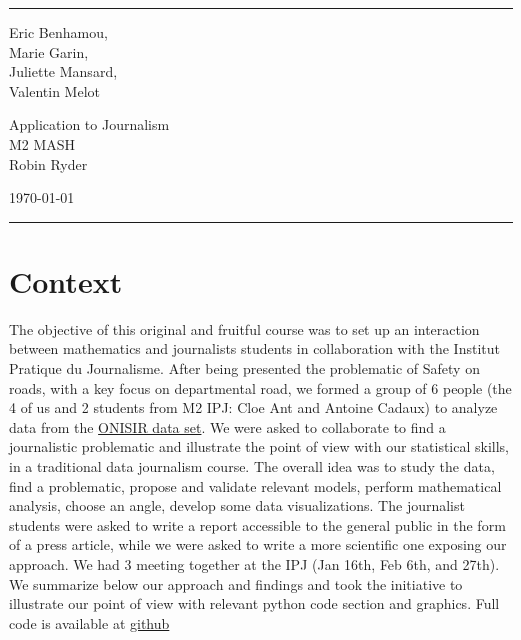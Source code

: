 \documentclass[a4paper]{article}
\theoremstyle{definition}
\theoremstyle{proposition}
\begin{document}

\fancyhead[C]{}
\hrule \medskip %
\begin{minipage}{0.295\textwidth} 
\raggedright
\footnotesize
Eric Benhamou, \hfill\\   
Marie Garin, \hfill\\   
Juliette Mansard, \hfill\\
Valentin Melot  \hfill\\
\end{minipage}
\begin{minipage}{0.4\textwidth} 
\centering 
\large 
Application to Journalism\\ 
\normalsize 
M2 MASH \\ 
Robin Ryder
\end{minipage}
\begin{minipage}{0.295\textwidth} 
\raggedleft
\today\hfill\\
\end{minipage}
\medskip\hrule 
\bigskip


\section{Context}
The objective of this original and fruitful course was to set up an interaction between mathematics and journalists students in collaboration with the Institut Pratique du Journalisme. After being presented the problematic of Safety on roads, with a key focus on departmental road, we formed a group of 6 people (the 4 of us and 2 students from M2 IPJ: Cloe Ant and Antoine Cadaux) to analyze data from the \href{https://www.data.gouv.fr/fr/datasets/base-de-donnees-accidents-corporels-de-la-circulation/}{ONISIR data set}. We were asked to collaborate to find a journalistic problematic and illustrate the point of view with our statistical skills, in a traditional data journalism course. The overall idea was to study the data, find a problematic, propose and validate relevant models, perform mathematical analysis, choose an angle, develop some data visualizations. The journalist students were asked to write a report accessible to the general public in the form of a press article, while we were asked to write a more scientific one exposing our approach. We had 3 meeting together at the IPJ (Jan 16th, Feb 6th, and 27th). We summarize below our approach and findings and took the initiative to illustrate our point of view with relevant python code section and graphics. Full code is available at \href{https://github.com/ericbenhamou/MASH_IPJ_2018}{github}
\end{document}
